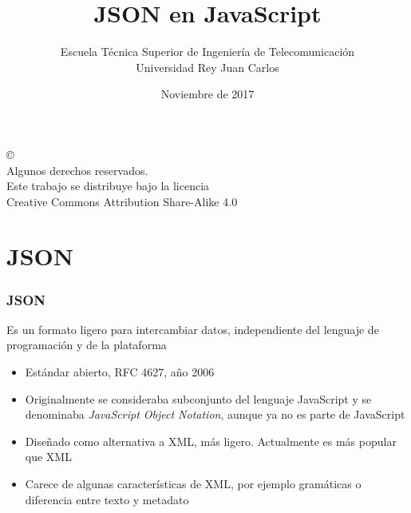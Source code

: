 \documentclass[ucs]{beamer}
\begin{document}
\title[JSON]{JSON en JavaScript }
\author[GSyC]{Escuela Técnica Superior de Ingeniería de Telecomunicación\\
Universidad Rey Juan Carlos}
\date[2017]{Noviembre de 2017}


\begin{frame}
  \titlepage
\end{frame}



\begin{frame}[b]
\begin{flushright}
{\tiny
\copyright \insertshortdate~\insertshortauthor \\
  Algunos derechos reservados. \\
  Este trabajo se distribuye bajo la licencia \\
  Creative Commons Attribution Share-Alike 4.0\\
}
\end{flushright}  
\end{frame}









\section{JSON}


\begin{frame}[fragile]
\frametitle{JSON}
Es un formato ligero para intercambiar datos, independiente del lenguaje de 
programación y de la plataforma
\begin{itemize}
\item
Estándar abierto, RFC 4627, año 2006
\item
Originalmente se consideraba subconjunto del lenguaje JavaScript y se
denominaba  \emph{JavaScript Object Notation}, aunque ya no es parte de JavaScript
\item
Diseñado como alternativa a XML, más ligero. Actualmente es más popular que XML
\item
Carece de algunas características de XML, por ejemplo gramáticas o diferencia entre texto y metadato 
\end{itemize}

\end{frame}
\end{document}
